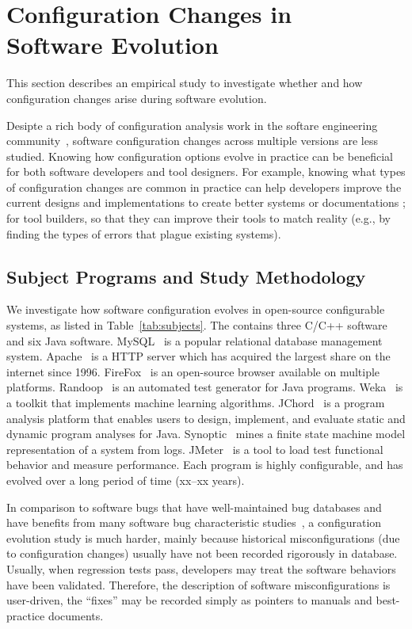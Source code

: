\section{Configuration Changes in\\ Software Evolution}
\label{sec:study}

This section describes an empirical study 
to investigate whether and how configuration changes
arise during software evolution.

Desipte a rich body of configuration analysis work
in the softare engineering community~\cite{},
software configuration changes across multiple
versions are less studied.
Knowing how configuration options evolve in practice
can be beneficial for both software developers
and tool designers. For example, knowing what types
of configuration changes are common in practice
can help developers improve the current designs and
implementations to create better systems or documentations
; for tool builders, so that they
can improve their tools to match reality (e.g.,
by finding the types of errors that plague
existing systems).




\subsection{Subject Programs and Study Methodology}

We investigate how software configuration evolves in
\studysubjnum open-source configurable systems, as listed
in Table~\ref{tab:subjects}. The \studysubjnum contains
three C/C++ software and six Java software.
MySQL~\cite{}  is a popular relational database management
system. Apache~\cite{} is a HTTP server which has acquired
the largest share on the internet since 1996. FireFox~\cite{}
is an open-source browser available on multiple platforms.
Randoop~\cite{} is an automated test generator for Java
programs. Weka~\cite{} is a toolkit that implements machine
learning algorithms. JChord~\cite{} is a program analysis platform that
enables users to design, implement, and evaluate static and
dynamic program analyses for Java. Synoptic~\cite{} mines a
finite state machine model representation of a system from
logs. JMeter~\cite{} is a tool to load test functional
behavior and measure performance.
Each program is highly configurable, and has evolved over
a long period of time (xx--xx years).


In comparison to software bugs that have well-maintained
bug databases and have benefits from many
software bug characteristic studies~\cite{},
a configuration evolution study is much harder, mainly
because historical misconfigurations (due
to configuration changes) usually have not been
recorded rigorously in database. Usually, when
regression tests pass, developers may treat the
software behaviors have been validated. Therefore,
the description of software misconfigurations is user-driven,
the ``fixes'' may be recorded simply as pointers
to manuals and best-practice documents.

